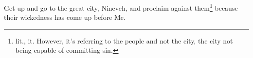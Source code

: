 
\begin{inparaenum}
     Get up and go to the great city, Nineveh, and proclaim against them\footnote{lit., it. However, it's referring to the people and not the city, the city not being capable of committing sin.} because their wickedness has come up before Me.%
\end{inparaenum}
